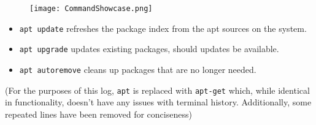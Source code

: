 \documentclass[11pt]{amsart}
\begin{document}
\begin{figure}[h]{}
\centering\texttt{[image: CommandShowcase.png]}


\end{figure}

\begin{itemize}

\item \texttt{apt update} refreshes the package index from the apt sources on the system.

\item \texttt{apt upgrade} updates existing packages, should updates be available.

\item \texttt{apt autoremove} cleans up packages that are no longer needed.

\end{itemize}


(For the purposes of this log, \texttt{apt} is replaced with \texttt{apt-get} which, while identical in functionality, doesn’t have any issues with terminal history. Additionally, some repeated lines have been removed for conciseness)
\end{document}
